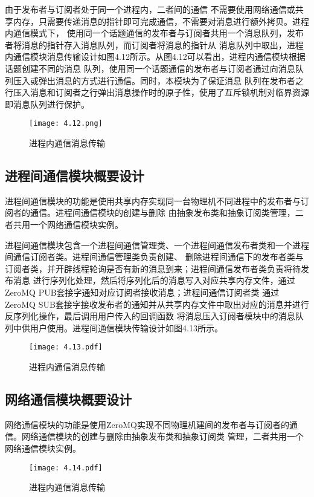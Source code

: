 由于发布者与订阅者处于同一个进程内，二者间的通信
不需要使用网络通信或共享内存，只需要传递消息的指针即可完成通信，不需要对消息进行额外拷贝。进程内通信模式下，
使用同一个话题通信的发布者与订阅者共用一个消息队列，发布者将消息的指针存入消息队列，而订阅者将消息的指针从
消息队列中取出，进程内通信模块消息传输设计如图4.12所示。从图4.12可以看出，进程内通信模块根据话题创建不同的消息
队列，使用同一个话题通信的发布者与订阅者通过向消息队列压入或弹出消息的方式进行通信。同时，本模块为了保证消息
队列在发布者之行压入消息和订阅者之行弹出消息操作时的原子性，使用了互斥锁机制对临界资源即消息队列进行保护。
\begin{figure}[H]
  \centering
  \texttt{[image: 4.12.png]}
  \caption{进程内通信消息传输}
  \label{fig:32}
\end{figure}

\subsection{进程间通信模块概要设计}
进程间通信模块的功能是使用共享内存实现同一台物理机不同进程中的发布者与订阅者的通信。进程间通信模块的创建与删除
由抽象发布类和抽象订阅类管理，二者共用一个网络通信模块实例。

进程间通信模块包含一个进程间通信管理类、一个进程间通信发布者类和一个进程间通信订阅者类。进程间通信管理类负责创建、
删除进程间通信下的发布者类与订阅者类，并开辟线程轮询是否有新的消息到来；进程间通信发布者类负责将待发布消息
进行序列化处理，然后将序列化后的消息写入对应共享内存文件，通过ZeroMQ PUB套接字通知对应订阅者接收消息；进程间通信订阅者类
通过ZeroMQ SUB套接字接收发布者的通知并从共享内存文件中取出对应的消息并进行反序列化操作，最后调用用户传入的回调函数
将消息压入订阅者模块中的消息队列中供用户使用。进程间通信模块传输设计如图4.13所示。
\begin{figure}[H]
  \centering
  \texttt{[image: 4.13.pdf]}
  \caption{进程内通信消息传输}
  \label{fig:33}
\end{figure}

\subsection{网络通信模块概要设计}
网络通信模块的功能是使用ZeroMQ实现不同物理机建间的发布者与订阅者的通信。网络通信模块的创建与删除由抽象发布类和抽象订阅类
管理，二者共用一个网络通信模块实例。

\begin{figure}[H]
  \centering
  \texttt{[image: 4.14.pdf]}
  \caption{进程内通信消息传输}
  \label{fig:34}
\end{figure}

